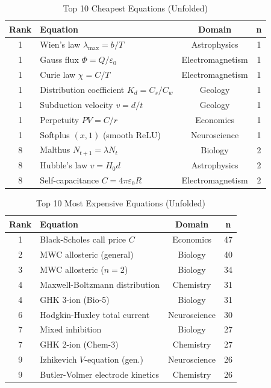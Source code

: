 \documentclass[12pt,a4paper]{article}
\theoremstyle{definition}
\newcommand{\LEAd}{\operatorname{LEAd}}
\begin{document}
\begin{table}[ht]
\centering
\caption{Top 10 Cheapest Equations (Unfolded)}
\label{tab:cheapest}
\begin{tabular}{clcc}
\toprule
\textbf{Rank} & \textbf{Equation} & \textbf{Domain} & \textbf{n} \\
\midrule
1 & Wien's law $\lambda_\mathrm{max}=b/T$    & Astrophysics    & 1 \\
1 & Gauss flux $\Phi=Q/\varepsilon_0$        & Electromagnetism & 1 \\
1 & Curie law $\chi=C/T$                    & Electromagnetism & 1 \\
1 & Distribution coefficient $K_d=C_s/C_w$  & Geology         & 1 \\
1 & Subduction velocity $v=d/t$             & Geology         & 1 \\
1 & Perpetuity $PV=C/r$                     & Economics       & 1 \\
1 & Softplus \LEAd$(x,1)$ (smooth ReLU)    & Neuroscience    & 1 \\
8 & Malthus $N_{t+1}=\lambda N_t$           & Biology         & 2 \\
8 & Hubble's law $v=H_0 d$                  & Astrophysics    & 2 \\
8 & Self-capacitance $C=4\pi\varepsilon_0 R$ & Electromagnetism & 2 \\
\bottomrule
\end{tabular}
\end{table}

\begin{table}[ht]
\centering
\caption{Top 10 Most Expensive Equations (Unfolded)}
\label{tab:most-expensive}
\begin{tabular}{clcc}
\toprule
\textbf{Rank} & \textbf{Equation} & \textbf{Domain} & \textbf{n} \\
\midrule
1  & Black-Scholes call price $C$        & Economics    & 47 \\
2  & MWC allosteric (general)            & Biology      & 40 \\
3  & MWC allosteric ($n=2$)              & Biology      & 34 \\
4  & Maxwell-Boltzmann distribution      & Chemistry    & 31 \\
4  & GHK 3-ion (Bio-5)                   & Biology      & 31 \\
6  & Hodgkin-Huxley total current        & Neuroscience & 30 \\
7  & Mixed inhibition                    & Biology      & 27 \\
7  & GHK 2-ion (Chem-3)                  & Chemistry    & 27 \\
9  & Izhikevich $V$-equation (gen.)      & Neuroscience & 26 \\
9  & Butler-Volmer electrode kinetics    & Chemistry    & 26 \\
\bottomrule
\end{tabular}
\end{table}
\end{document}
